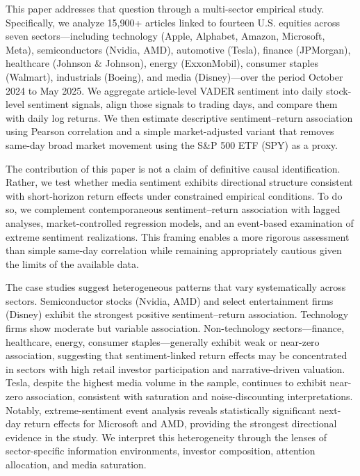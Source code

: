 \documentclass[lettersize,journal]{IEEEtran}
\begin{document}
This paper addresses that question through a multi-sector empirical study. Specifically, we analyze 15{,}900+ articles linked to fourteen U.S. equities across seven sectors---including technology (Apple, Alphabet, Amazon, Microsoft, Meta), semiconductors (Nvidia, AMD), automotive (Tesla), finance (JPMorgan), healthcare (Johnson \& Johnson), energy (ExxonMobil), consumer staples (Walmart), industrials (Boeing), and media (Disney)---over the period October 2024 to May 2025. We aggregate article-level VADER sentiment into daily stock-level sentiment signals, align those signals to trading days, and compare them with daily log returns. We then estimate descriptive sentiment--return association using Pearson correlation and a simple market-adjusted variant that removes same-day broad market movement using the S\&P 500 ETF (SPY) \cite{sp500index} as a proxy.

The contribution of this paper is not a claim of definitive causal identification. Rather, we test whether media sentiment exhibits directional structure consistent with short-horizon return effects under constrained empirical conditions. To do so, we complement contemporaneous sentiment--return association with lagged analyses, market-controlled regression models, and an event-based examination of extreme sentiment realizations. This framing enables a more rigorous assessment than simple same-day correlation while remaining appropriately cautious given the limits of the available data.

The case studies suggest heterogeneous patterns that vary systematically across sectors. Semiconductor stocks (Nvidia, AMD) and select entertainment firms (Disney) exhibit the strongest positive sentiment--return association. Technology firms show moderate but variable association. Non-technology sectors---finance, healthcare, energy, consumer staples---generally exhibit weak or near-zero association, suggesting that sentiment-linked return effects may be concentrated in sectors with high retail investor participation and narrative-driven valuation. Tesla, despite the highest media volume in the sample, continues to exhibit near-zero association, consistent with saturation and noise-discounting interpretations. Notably, extreme-sentiment event analysis reveals statistically significant next-day return effects for Microsoft and AMD, providing the strongest directional evidence in the study. We interpret this heterogeneity through the lenses of sector-specific information environments, investor composition, attention allocation, and media saturation.
\end{document}
